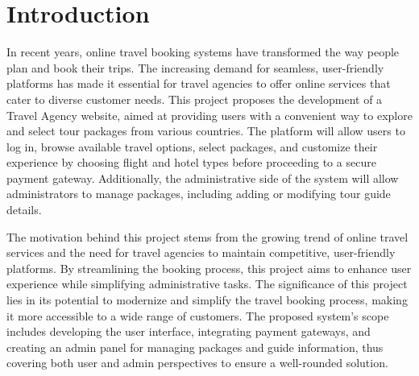 \newpage
\section{Introduction}
In recent years, online travel booking systems have transformed the way people plan and book their trips. The increasing demand for seamless, user-friendly platforms has made it essential for travel agencies to offer online services that cater to diverse customer needs. This project proposes the development of a Travel Agency website, aimed at providing users with a convenient way to explore and select tour packages from various countries. The platform will allow users to log in, browse available travel options, select packages, and customize their experience by choosing flight and hotel types before proceeding to a secure payment gateway. Additionally, the administrative side of the system will allow administrators to manage packages, including adding or modifying tour guide details.

The motivation behind this project stems from the growing trend of online travel services and the need for travel agencies to maintain competitive, user-friendly platforms. By streamlining the booking process, this project aims to enhance user experience while simplifying administrative tasks. The significance of this project lies in its potential to modernize and simplify the travel booking process, making it more accessible to a wide range of customers. The proposed system's scope includes developing the user interface, integrating payment gateways, and creating an admin panel for managing packages and guide information, thus covering both user and admin perspectives to ensure a well-rounded solution.\cite{ref1}

